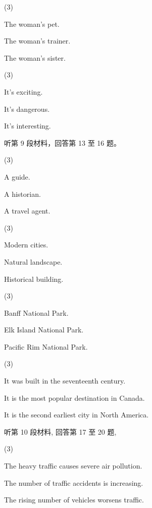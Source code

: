 \documentclass{英语试卷}
\begin{document}
\begin{choices}(3)
  \item The woman's pet.
  \item The woman's trainer.
  \item The woman's sister.
\end{choices}
\begin{choices}(3)
  \item It's exciting.
  \item It's dangerous.
  \item It's interesting.
\end{choices}
\par 听第 9 段材料，回答第 13 至 16 题。\par
{}
\begin{choices}(3)
  \item A guide.
  \item A historian.
  \item A travel agent.
\end{choices}
\begin{choices}(3)
  \item Modern cities.
  \item Natural landscape.
  \item Historical building.
\end{choices}
\begin{choices}(3)
  \item Banff National Park.
  \item Elk Island National Park.
  \item Pacific Rim National Park.
\end{choices}
\begin{choices}(3)
  \item It was built in the seventeenth century.
  \item It is the most popular destination in Canada.
  \item It is the second earliest city in North America.
\end{choices}
\par 听第 10 段材料, 回答第 17 至 20 题,\par
{}
\begin{choices}(3)
  \item The heavy traffic causes severe air pollution.
  \item The number of traffic accidents is increasing.
  \item The rising number of vehicles worsens traffic.
\end{choices}
\end{document}
